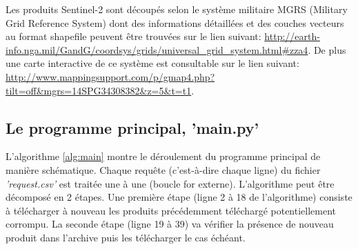 \documentclass[notitlepage]{report}
\begin{document}
Les produits Sentinel-2 sont découpés selon le système militaire MGRS (Military Grid Reference System) dont des informations détaillées et des couches vecteurs au format shapefile peuvent être trouvées sur le lien suivant: \url{http://earth-info.nga.mil/GandG/coordsys/grids/universal_grid_system.html\#zza4}. De plus une carte interactive de ce système est consultable sur le lien suivant: \url{http://www.mappingsupport.com/p/gmap4.php?tilt=off&mgrs=14SPG34308382&z=5&t=t1}.

\subsection{Le programme principal, 'main.py'}
L'algorithme \ref{alg:main} montre le déroulement du programme principal de manière schématique. Chaque requête (c'est-à-dire chaque ligne) du fichier \emph{'request.csv'} est traitée une à une (boucle for externe). L'algorithme peut être décomposé en 2 étapes. Une première étape (ligne 2 à 18 de l'algorithme) consiste à télécharger à nouveau les produits précédemment téléchargé potentiellement corrompu. La seconde étape (ligne 19 à 39) va vérifier la présence de nouveau produit dans l'archive puis les télécharger le cas échéant.
\end{document}
